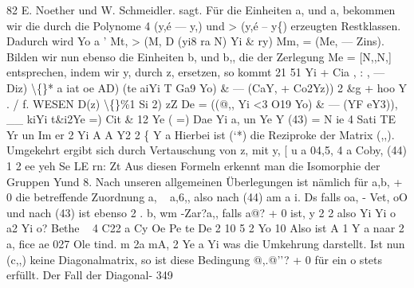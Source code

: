 \documentclass[11pt,a4paper]{article}
\theoremstyle{plain}
\theoremstyle{definition}
\begin{document}
82 
E. Noether und W. Schmeidler. 
sagt. 
Für die Einheiten a, und a, bekommen wir die durch die Polynome 
4 (y,é --- y,) und > (y,é -- y\{) erzeugten Restklassen. 
Dadurch wird 
Yo 
a 
' 
Mt, > (M, D (yi8 ra N) 
Yi 
\& 
ry) 
Mm, = (Me, --- Zins). 
Bilden 
wir 
nun 
ebenso 
die Einheiten 
b, und 
b,, die der Zerlegung 
Me = [N,,N,] entsprechen, indem wir y, durch z, ersetzen, so kommt 
21 
51 Yi + Cia 
, 
: 
, 
--- Diz) \textbackslash\{\}* a iat oe AD) (te aiYi 
T Ga9 Yo) 
\& --- (CaY, + Co2Yz)) 
2 
\&g 
+ hoo Y 
. 
/ 
f. 
WESEN 
D(z) \textbackslash\{\}\%1 Si 2) zZ De = ((@,, Yi <3 O19 Yo) \& --- (YF eY3)), 
\_\_ kiYi t\&i2Ye =) 
Cit \& 12 Ye ( =) 
Dae 
Yi 
a, un 
Ye 
Y 
(43) 
= N 
ie 4 Sati TE 
Yr un Im er 
2 
Yi 
A 
A 
Y2 
2 
\{ 
Y\guillemotright{} 
a 
Hierbei ist (\guillemotleft{}`*) die Reziproke der Matrix (\guillemotleft{},,). 
Umgekehrt ergibt sich durch Vertauschung von z, mit y, 
[ u a 04,5, 4 a Coby, 
(44) 
1 
2 
ee 
yeh Se LE 
rn: 
Zt 
Aus diesen Formeln erkennt man die Isomorphie der Gruppen 
Yund 8. Nach 
unseren allgemeinen Überlegungen ist nämlich für a,b, + 0 die betreffende 
Zuordnung a, ~ a,6,, also nach (44) 
am a i. Ds 
falls 
oa, - Vet, 
oO 
und nach (43) ist ebenso 
2 
. 
b, 
wm -Zar?a,, 
falls 
a@\textdegree{}? + 0 ist, 
y 
2 
2 
also 
Yi 
Yi 
o 
a2 
Yi 
o? 
Bethe 
~ 
4 
C22 a Cy Oe 
Pe 
te De 
2 
10 
5 
2 
Yo 
10 
Also ist 
A 
1 
Y 
a naar 2 a, 
fice 
ae 
027 
Ole 
tind. m 2a mA, 
2 
Ye 
a Yi 
was die Umkehrung darstellt. 
Ist nun (c,,) keine Diagonalmatrix, so ist 
diese Bedingung @,.\guillemotleft{}@''? + 0 für ein o stets erfüllt. 
Der Fall der Diagonal- 
349
\end{document}
